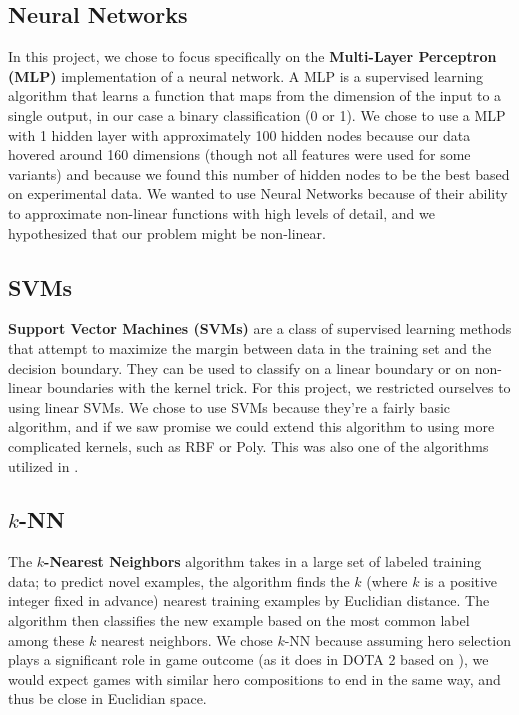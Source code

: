 \documentclass[11pt,letterpaper]{article}
\begin{document}
\subsection{Neural Networks}
In this project, we chose to focus specifically on the \textbf{Multi-Layer Perceptron (MLP)} implementation of a neural network. A MLP is a supervised learning algorithm that learns a function that maps from the dimension of the input to a single output, in our case a binary classification (0 or 1). We chose to use a MLP with 1 hidden layer with approximately 100 hidden nodes because our data hovered around 160 dimensions (though not all features were used for some variants) and because we found this number of hidden nodes to be the best based on experimental data. We wanted to use Neural Networks because of their ability to approximate non-linear functions with high levels of detail, and we hypothesized that our problem might be non-linear.

\subsection{SVMs}
\textbf{Support Vector Machines (SVMs)} are a class of supervised learning methods that attempt to maximize the margin between data in the training set and the decision boundary. They can be used to classify on a linear boundary or on non-linear boundaries with the kernel trick. For this project, we restricted ourselves to using linear SVMs. We chose to use SVMs because they're a fairly basic algorithm, and if we saw promise we could extend this algorithm to using more complicated kernels, such as RBF or Poly. This was also one of the algorithms utilized in \cite{ODP:15}.

\subsection{$k$-NN}
The $k$\textbf{-Nearest Neighbors} algorithm takes in a large set of labeled training data; to predict novel examples, the algorithm finds the $k$ (where $k$ is a positive integer fixed in advance) nearest training examples by Euclidian distance. The algorithm then classifies the new example based on the most common label among these $k$ nearest neighbors. We chose $k$-NN because assuming hero selection plays a significant role in game outcome (as it does in DOTA 2 based on \cite{PEA:13}), we would expect games with similar hero compositions to end in the same way, and thus be close in Euclidian space.
\end{document}
